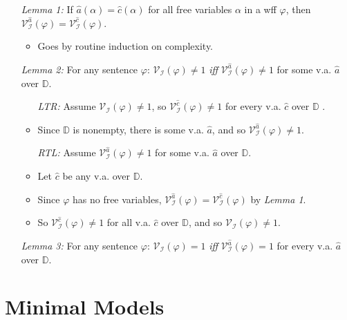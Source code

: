 \documentclass[a4paper, 11pt]{article} %
\newcommand{\I}{\mathcal{I}}
\newcommand{\D}{\mathbb{D}}
\newcommand{\VV}[2]{\mathcal{V}_{#1}^{#2}} %
\begin{document}
\begin{enumerate}
  \item[\it Lemma 1:] If $\hat{a}(\alpha)=\hat{c}(\alpha)$ for all free variables $\alpha$ in a wff $\varphi$, then $\VV{\I}{\hat{a}}(\varphi)=\VV{\I}{\hat{c}}(\varphi)$.
    \begin{itemize}
      \item Goes by routine induction on complexity.
    \end{itemize}
  \item[\it Lemma 2:] For any sentence $\varphi$: $\VV{\I}{}(\varphi)\neq 1$ \textit{iff} $\VV{\I}{\hat{a}}(\varphi)\neq 1$ for some v.a. $\hat{a}$ over $\D$.
    \begin{itemize}
      \item[\it LTR:] Assume $\VV{\I}{}(\varphi)\neq 1$, so $\VV{\I}{\hat{c}}(\varphi)\neq 1$ for every v.a. $\hat{c}$ over $\D$ .
      \item Since $\D$ is nonempty, there is some v.a. $\hat{a}$, and so $\VV{\I}{\hat{a}}(\varphi)\neq 1$. 
      \item[\it RTL:] Assume $\VV{\I}{\hat{a}}(\varphi)\neq 1$ for some v.a. $\hat{a}$ over $\D$.
      \item Let $\hat{c}$ be any v.a. over $\D$.
      \item Since $\varphi$ has no free variables, $\VV{\I}{\hat{a}}(\varphi)=\VV{\I}{\hat{c}}(\varphi)$ by \textit{Lemma 1}.
      \item So $\VV{\I}{\hat{c}}(\varphi)\neq 1$ for all v.a. $\hat{c}$ over $\D$, and so $\VV{\I}{}(\varphi)\neq 1$.
    \end{itemize}
  \item[\it Lemma 3:] For any sentence $\varphi$: $\VV{\I}{}(\varphi)=1$ \textit{iff} $\VV{\I}{\hat{a}}(\varphi)=1$ for every v.a. $\hat{a}$ over $\D$.
\end{enumerate}



\section*{Minimal Models}
\end{document}
